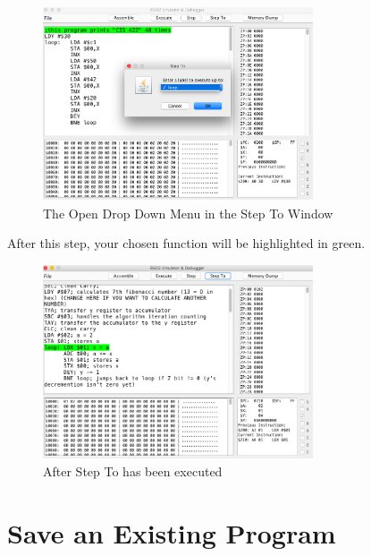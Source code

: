 \documentclass[a3paper, 11pt]{article}
\begin{document}
\begin{enumerate}
	\begin{figure}[h!]
		\centering
		\includegraphics[width=8cm, height=5.74cm]{StepToOpenMenu}
		\caption{The Open Drop Down Menu in the Step To Window}
	\end{figure}
	\par
	After this step, your chosen function will be highlighted in green. 
	\begin{figure}[h!]
		\centering
		\includegraphics[width=8cm, height=5.74cm]{AfterStepTo}
		\caption{After Step To has been executed}
	\end{figure}
\end{enumerate}
\clearpage

\section{Save an Existing Program}
\end{document}
